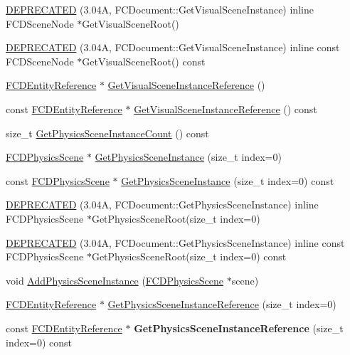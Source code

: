 \begin{DoxyCompactItemize}
\item 
\hyperlink{classFCDocument_a3c076aab82123c67d2e2dadaf5f11e49}{DEPRECATED} (3.04A, FCDocument::GetVisualSceneInstance) inline FCDSceneNode $\ast$GetVisualSceneRoot()
\item 
\hyperlink{classFCDocument_a1da26c9aa65ebf5da47483b48b536750}{DEPRECATED} (3.04A, FCDocument::GetVisualSceneInstance) inline const FCDSceneNode $\ast$GetVisualSceneRoot() const 
\item 
\hyperlink{classFCDEntityReference}{FCDEntityReference} $\ast$ \hyperlink{classFCDocument_a4ec1d4650e2d522d7168e708644582cc}{GetVisualSceneInstanceReference} ()
\item 
const \hyperlink{classFCDEntityReference}{FCDEntityReference} $\ast$ \hyperlink{classFCDocument_a7366c9e685cc218ce9bdb5ac5290fda1}{GetVisualSceneInstanceReference} () const 
\item 
size\_\-t \hyperlink{classFCDocument_a9884dd92a651dc1505ba23728e169721}{GetPhysicsSceneInstanceCount} () const 
\item 
\hyperlink{classFCDPhysicsScene}{FCDPhysicsScene} $\ast$ \hyperlink{classFCDocument_a8c1781498f018e02067cbddd1755b749}{GetPhysicsSceneInstance} (size\_\-t index=0)
\item 
const \hyperlink{classFCDPhysicsScene}{FCDPhysicsScene} $\ast$ \hyperlink{classFCDocument_a8d8e6f1695c18dbd27a0569d22c140ff}{GetPhysicsSceneInstance} (size\_\-t index=0) const 
\item 
\hyperlink{classFCDocument_a43ba7d9889f88543ba18e5d400f6f68b}{DEPRECATED} (3.04A, FCDocument::GetPhysicsSceneInstance) inline FCDPhysicsScene $\ast$GetPhysicsSceneRoot(size\_\-t index=0)
\item 
\hyperlink{classFCDocument_aa8dccbc6d424dc81918d7c13aa91f571}{DEPRECATED} (3.04A, FCDocument::GetPhysicsSceneInstance) inline const FCDPhysicsScene $\ast$GetPhysicsSceneRoot(size\_\-t index=0) const 
\item 
void \hyperlink{classFCDocument_a1b321fb096c702557da428e067812264}{AddPhysicsSceneInstance} (\hyperlink{classFCDPhysicsScene}{FCDPhysicsScene} $\ast$scene)
\item 
\hyperlink{classFCDEntityReference}{FCDEntityReference} $\ast$ \hyperlink{classFCDocument_ad833d1ee076c80cef4deee35cbff7702}{GetPhysicsSceneInstanceReference} (size\_\-t index=0)
\item 
\hypertarget{classFCDocument_a01118785d29906cf85df14de126aa8cf}{
const \hyperlink{classFCDEntityReference}{FCDEntityReference} $\ast$ {\bfseries GetPhysicsSceneInstanceReference} (size\_\-t index=0) const }
\label{classFCDocument_a01118785d29906cf85df14de126aa8cf}


\end{DoxyCompactItemize}
